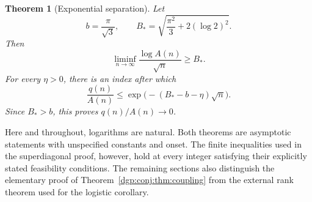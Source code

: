 \documentclass[11pt,letterpaper]{article}
\numberwithin{equation}{section}
\newtheorem{theorem}{Theorem}[section]
\theoremstyle{remark}\newtheorem{remark}[theorem]{Remark}
\begin{document}
\begin{theorem}[Exponential separation]\label{dgp:conj:thm:super}
Let
\begin{equation}\label{dgp:conj:eq:constants}
 b=\frac\pi{\sqrt3},\qquad
 B_*=\sqrt{\frac{\pi^2}{3}+2(\log2)^2}.
\end{equation}
Then
\begin{equation}\label{dgp:conj:eq:strong}
 \liminf_{n\to\infty}\frac{\log A(n)}{\sqrt n}\geq B_*.
\end{equation}
For every $\eta>0$, there is an index after which
\begin{equation}\label{dgp:conj:eq:ratio}
 \frac{q(n)}{A(n)}
 \leq \exp\bigl(-(B_*-b-\eta)\sqrt n\bigr).
\end{equation}
Since $B_*>b$, this proves $q(n)/A(n)\to0$.
\end{theorem}

Here and throughout, logarithms are natural. Both theorems are
asymptotic statements with unspecified constants and onset. The
finite inequalities used in the superdiagonal proof, however, hold
at every integer satisfying their explicitly stated feasibility
conditions. The remaining sections also distinguish the elementary
proof of Theorem~\ref{dgp:conj:thm:coupling} from the external rank theorem
used for the logistic corollary.
\end{document}
